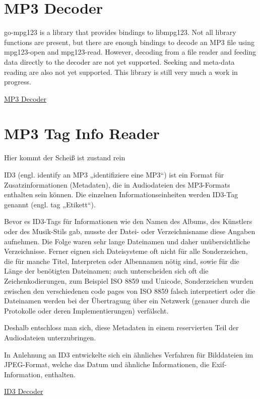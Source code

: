 \section{MP3 Decoder}
go-mpg123 is a library that provides bindings to libmpg123.
Not all library functions are present, but there are enough bindings to decode an MP3 file using mpg123-open and mpg123-read. However, decoding from a file reader and feeding data directly to the decoder are not yet supported. Seeking and meta-data reading are also not yet supported.
This library is still very much a work in progress.

\href{https://github.com/bobertlo/go-mpg123}{MP3 Decoder}

\section{MP3 Tag Info Reader}
Hier kommt der Scheiß ist zustand rein

ID3 (engl. identify an MP3 „identifiziere eine MP3“) ist ein Format für Zusatzinformationen (Metadaten), die in Audiodateien des MP3-Formats enthalten sein können. Die einzelnen Informationseinheiten werden ID3-Tag genannt (engl. tag „Etikett“).

Bevor es ID3-Tags für Informationen wie den Namen des Albums, des Künstlers oder des Musik-Stils gab, musste der Datei- oder Verzeichnisname diese Angaben aufnehmen. Die Folge waren sehr lange Dateinamen und daher unübersichtliche Verzeichnisse. Ferner eignen sich Dateisysteme oft nicht für alle Sonderzeichen, die für manche Titel, Interpreten oder Albennamen nötig sind, sowie für die Länge der benötigten Dateinamen; auch unterscheiden sich oft die Zeichenkodierungen, zum Beispiel ISO 8859 und Unicode, Sonderzeichen wurden zwischen den verschiedenen code pages von ISO 8859 falsch interpretiert oder die Dateinamen werden bei der Übertragung über ein Netzwerk (genauer durch die Protokolle oder deren Implementierungen) verfälscht.

Deshalb entschloss man sich, diese Metadaten in einem reservierten Teil der Audiodateien unterzubringen.

In Anlehnung an ID3 entwickelte sich ein ähnliches Verfahren für Bilddateien im JPEG-Format, welche das Datum und ähnliche Informationen, die Exif-Information, enthalten.

\href{https://github.com/mikkyang/id3-go}{ID3 Decoder}
